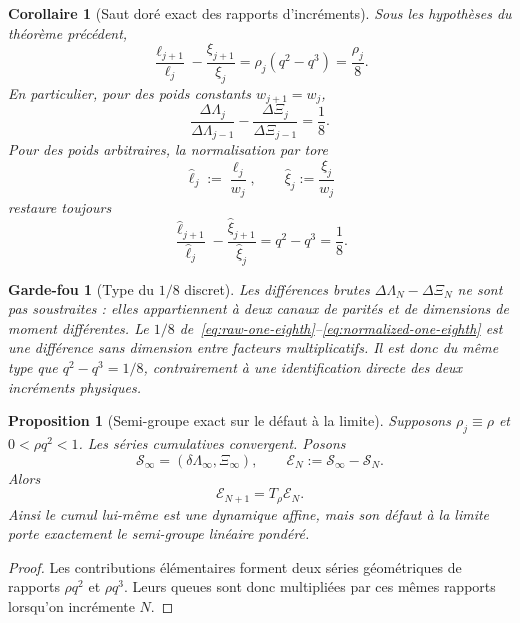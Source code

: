 \documentclass[11pt,a4paper]{article}
\newtheorem{proposition}[theorem]{Proposition}
\newtheorem{corollary}[theorem]{Corollaire}
\newtheorem{guardrail}[theorem]{Garde-fou}
\begin{document}
\begin{corollary}[Saut doré exact des rapports d'incréments]\label{cor:increment-one-eighth}
Sous les hypothèses du théorème précédent,
\begin{equation}\label{eq:weighted-one-eighth}
 \boxed{
 \frac{\ell_{j+1}}{\ell_j}
 -\frac{\xi_{j+1}}{\xi_j}
 =\rho_j(q^2-q^3)=\frac{\rho_j}{8}.}
\end{equation}
En particulier, pour des poids constants $w_{j+1}=w_j$,
\begin{equation}\label{eq:raw-one-eighth}
 \boxed{
 \frac{\Delta\Lambda_{j}}{\Delta\Lambda_{j-1}}
 -\frac{\Delta\Xi_{j}}{\Delta\Xi_{j-1}}
 =\frac18.}
\end{equation}
Pour des poids arbitraires, la normalisation par tore
\[
 \widehat\ell_j:=\frac{\ell_j}{w_j},
 \qquad
 \widehat\xi_j:=\frac{\xi_j}{w_j}
\]
restaure toujours
\begin{equation}\label{eq:normalized-one-eighth}
 \boxed{
 \frac{\widehat\ell_{j+1}}{\widehat\ell_j}
 -\frac{\widehat\xi_{j+1}}{\widehat\xi_j}
 =q^2-q^3=\frac18.}
\end{equation}
\end{corollary}

\begin{guardrail}[Type du $1/8$ discret]
Les différences brutes $\Delta\Lambda_N-\Delta\Xi_N$ ne sont pas soustraites : elles appartiennent à deux canaux de parités et de dimensions de moment différentes. Le $1/8$ de~\eqref{eq:raw-one-eighth}--\eqref{eq:normalized-one-eighth} est une différence \emph{sans dimension entre facteurs multiplicatifs}. Il est donc du même type que $q^2-q^3=1/8$, contrairement à une identification directe des deux incréments physiques.
\end{guardrail}

\begin{proposition}[Semi-groupe exact sur le défaut à la limite]\label{prop:tail-semigroup}
Supposons $\rho_j\equiv\rho$ et $0<\rho q^2<1$. Les séries cumulatives convergent. Posons
\[
 \mathscr S_\infty=(\delta\Lambda_\infty,\Xi_\infty),
 \qquad
 \mathscr E_N:=\mathscr S_\infty-\mathscr S_N.
\]
Alors
\begin{equation}\label{eq:tail-semigroup}
 \boxed{\mathscr E_{N+1}=T_\rho\mathscr E_N.}
\end{equation}
Ainsi le cumul lui-même est une dynamique affine, mais son défaut à la limite porte exactement le semi-groupe linéaire pondéré.
\end{proposition}

\begin{proof}
Les contributions élémentaires forment deux séries géométriques de rapports $\rho q^2$ et $\rho q^3$. Leurs queues sont donc multipliées par ces mêmes rapports lorsqu'on incrémente $N$.
\end{proof}
\end{document}
